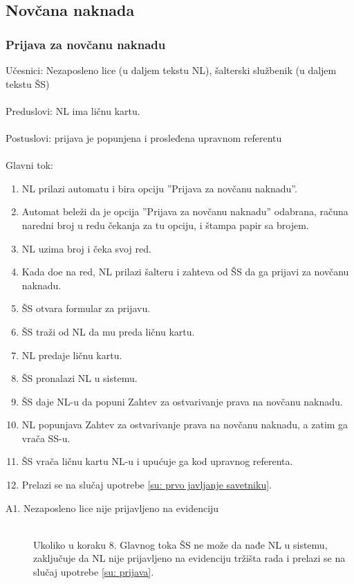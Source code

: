\subsection{Nov\v cana naknada}



\subsubsection{Prijava za nov\v canu naknadu}

\noindent Učesnici: Nezaposleno lice (u daljem tekstu NL), šalterski službenik (u daljem tekstu ŠS)
\\
\\ Preduslovi: NL ima ličnu kartu.
\\
\\ Postuslovi: prijava je popunjena i prosleđena upravnom referentu
\\
\\ Glavni tok:
\begin{enumerate}
\item NL prilazi automatu i bira opciju ''Prijava za novčanu naknadu''.
\item Automat bele\v zi da je opcija ''Prijava za novčanu naknadu'' odabrana, ra\v cuna naredni broj u redu \v cekanja za tu opciju, i \v stampa papir sa brojem.
\item NL uzima broj i \v ceka svoj red.
	\item Kada do\dj e na red, NL prilazi \v salteru i zahteva od \v SS da ga prijavi za novčanu naknadu.
	\item \v SS otvara formular za prijavu.
	\item \v SS tra\v zi od NL da mu preda li\v cnu kartu.
	\item NL predaje li\v cnu kartu.
    \item \v SS pronalazi NL u sistemu.
	\item \v SS daje NL-u da popuni Zahtev za ostvarivanje prava na novčanu naknadu.
	\item NL popunjava Zahtev za ostvarivanje prava na novčanu naknadu, a zatim ga vra\v ca SS-u.
	\item \v SS vra\v ca ličnu kartu NL-u i upućuje ga kod upravnog referenta.
	\item Prelazi se na slu\v caj upotrebe \ref{su: prvo javljanje savetniku}.
\end{enumerate}

\begin{description}
	\item[A1. Nezaposleno lice nije prijavljeno na evidenciju] ~\\
	Ukoliko u koraku 8. Glavnog toka ŠS ne može da nađe NL u sistemu, zaključuje da NL nije prijavljeno na evidenciju tržišta rada i prelazi se na slučaj upotrebe \ref{su: prijava}.
\end{description}

